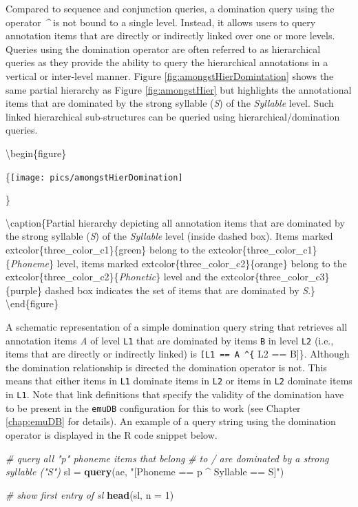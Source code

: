 \documentclass[]{book}
\newenvironment{Shaded}{\begin{snugshade}}{\end{snugshade}}
\newcommand{\CommentTok}[1]{\textcolor[rgb]{0.56,0.35,0.01}{\textit{#1}}}
\newcommand{\DataTypeTok}[1]{\textcolor[rgb]{0.13,0.29,0.53}{#1}}
\newcommand{\DecValTok}[1]{\textcolor[rgb]{0.00,0.00,0.81}{#1}}
\newcommand{\KeywordTok}[1]{\textcolor[rgb]{0.13,0.29,0.53}{\textbf{#1}}}
\newcommand{\NormalTok}[1]{#1}
\newcommand{\StringTok}[1]{\textcolor[rgb]{0.31,0.60,0.02}{#1}}
\begin{document}
Compared to sequence and conjunction queries, a domination query using the operator \emph{\^{}} is not bound to a single level. Instead, it allows users to query annotation items that are directly or indirectly linked over one or more levels. Queries using the domination operator are often referred to as hierarchical queries as they provide the ability to query the hierarchical annotations in a vertical or inter-level manner. Figure \ref{fig:amongstHierDomintation} shows the same partial hierarchy as Figure \ref{fig:amongstHier} but highlights the annotational items that are dominated by the strong syllable (\emph{S}) of the \emph{Syllable} level. Such linked hierarchical sub-structures can be queried using hierarchical/domination queries.

\textbackslash{}begin\{figure\}

\{\centering \texttt{[image: pics/amongstHierDomination]}

\}

\textbackslash{}caption\{Partial hierarchy depicting all annotation items that are dominated by the strong syllable (\emph{S}) of the \emph{Syllable} level (inside dashed box). Items marked extcolor\{three\_color\_c1\}\{green\} belong to the extcolor\{three\_color\_c1\}\{\emph{Phoneme}\} level, items marked extcolor\{three\_color\_c2\}\{orange\} belong to the extcolor\{three\_color\_c2\}\{\emph{Phonetic}\} level and the extcolor\{three\_color\_c3\}\{purple\} dashed box indicates the set of items that are dominated by \emph{S}.\}\label{fig:amongstHierDomintation}
\textbackslash{}end\{figure\}

A schematic representation of a simple domination query string that retrieves all annotation items \emph{A} of level \texttt{L1} that are dominated by items \texttt{B} in level \texttt{L2} (i.e., items that are directly or indirectly linked) is \texttt{{[}L1\ ==\ A\ \^{}\{} L2 == B{]}\}. Although the domination relationship is directed the domination operator is not. This means that either items in \texttt{L1} dominate items in \texttt{L2} or items in \texttt{L2} dominate items in \texttt{L1}. Note that link definitions that specify the validity of the domination have to be present in the \texttt{emuDB} configuration for this to work (see Chapter \ref{chap:emuDB} for details). An example of a query string using the domination operator is displayed in the R code snippet below.

\begin{Shaded}
\begin{Highlighting}[]
\CommentTok{# query all "p" phoneme items that belong}
\CommentTok{# to / are dominated by a strong syllable ("S")}
\NormalTok{sl =}\StringTok{ }\KeywordTok{query}\NormalTok{(ae, }\StringTok{"[Phoneme == p ^ Syllable == S]"}\NormalTok{)}

\CommentTok{# show first entry of sl}
\KeywordTok{head}\NormalTok{(sl, }\DataTypeTok{n =} \DecValTok{1}\NormalTok{)}
\end{Highlighting}
\end{Shaded}
\end{document}
